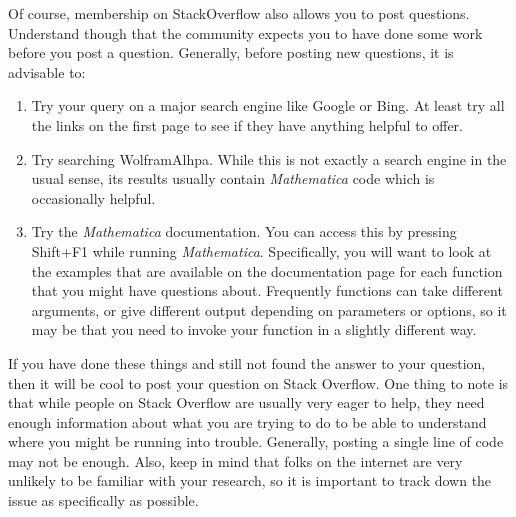 Of course, membership on StackOverflow also allows you to post questions. Understand though that the community expects you to have done some work before you post a question. Generally, before posting new questions, it is advisable to:

\begin{enumerate}
	   \item Try your query on a major search engine like Google or Bing. At least try all the links on the first page to see if they have anything helpful to offer.
	   \item Try searching WolframAlhpa. While this is not exactly a search engine in the usual sense, its results usually contain \emph{Mathematica} code which is occasionally helpful.
	   \item Try the \emph{Mathematica} documentation. You can access this by pressing Shift+F1 while running \emph{Mathematica}. Specifically, you will want to look at the examples that are available on the documentation page for each function that you might have questions about. Frequently functions can take different arguments, or give different output depending on parameters or options, so it may be that you need to invoke your function in a slightly different way. 
\end{enumerate}

If you have done these things and still not found the answer to your question, then it will be cool to post your question on Stack Overflow. One thing to note is that while people on Stack Overflow are usually very eager to help, they need enough information about what you are trying to do to be able to understand where you might be running into trouble. Generally, posting a single line of code may not be enough. Also, keep in mind that folks on the internet are very unlikely to be familiar with your research, so it is important to track down the issue as specifically as possible.

